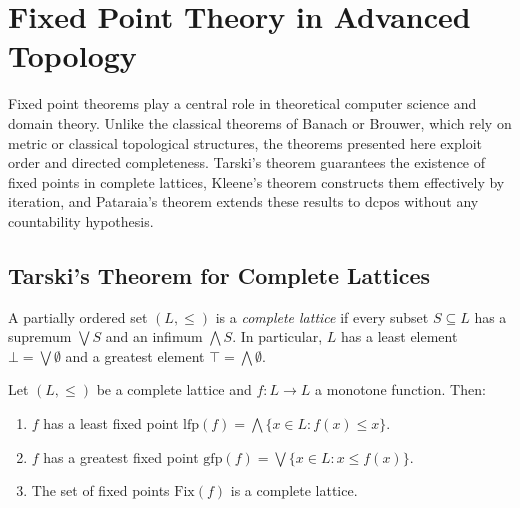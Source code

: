 \chapter{Fixed Point Theory in Advanced Topology}
\label{ch:fixed_points}

\begin{intuition}
Fixed point theorems play a central role in theoretical computer science and domain theory.
Unlike the classical theorems of Banach or Brouwer, which rely on metric or classical
topological structures, the theorems presented here exploit order and directed completeness.
Tarski's theorem guarantees the existence of fixed points in complete lattices, Kleene's
theorem constructs them effectively by iteration, and Pataraia's theorem extends these
results to dcpos without any countability hypothesis.
\end{intuition}

\section{Tarski's Theorem for Complete Lattices}

\begin{definition}
A partially ordered set $(L, \leq)$ is a \emph{complete lattice} if every subset
$S \subseteq L$ has a supremum $\bigvee S$ and an infimum $\bigwedge S$. In particular,
$L$ has a least element $\bot = \bigvee \emptyset$ and a greatest element
$\top = \bigwedge \emptyset$.
\end{definition}

\begin{theorem}
\label{thm:knaster-tarski}
Let $(L, \leq)$ be a complete lattice and $f\colon L \to L$ a monotone function. Then:
\begin{enumerate}
  \item $f$ has a least fixed point
    $\mathrm{lfp}(f) = \bigwedge \{x \in L : f(x) \leq x\}$.
  \item $f$ has a greatest fixed point
    $\mathrm{gfp}(f) = \bigvee \{x \in L : x \leq f(x)\}$.
  \item The set of fixed points $\mathrm{Fix}(f)$ is a complete lattice.
\end{enumerate}
\end{theorem}

